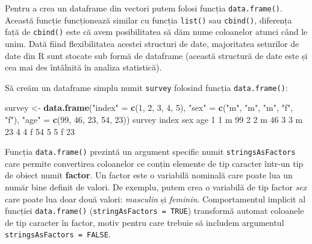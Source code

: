 \documentclass[]{article}
\newenvironment{Shaded}{\begin{snugshade}}{\end{snugshade}}
\newcommand{\DecValTok}[1]{\textcolor[rgb]{0.00,0.00,0.81}{#1}}
\newcommand{\KeywordTok}[1]{\textcolor[rgb]{0.13,0.29,0.53}{\textbf{#1}}}
\newcommand{\NormalTok}[1]{#1}
\newcommand{\StringTok}[1]{\textcolor[rgb]{0.31,0.60,0.02}{#1}}
\begin{document}
Pentru a crea un dataframe din vectori putem folosi funcția
\texttt{data.frame()}. Această funcție funcționează similar cu funcția
\texttt{list()} sau \texttt{cbind()}, diferența față de \texttt{cbind()}
este că avem posibilitatea să dăm nume coloanelor atunci când le unim.
Dată fiind flexibilitatea acestei structuri de date, majoritatea
seturilor de date din R sunt stocate sub formă de dataframe (această
structură de date este și cea mai des întâlnită în analiza statistică).

Să creăm un dataframe simplu numit \texttt{survey} folosind funcția
\texttt{data.frame()}:

\begin{Shaded}
\begin{Highlighting}[]
\NormalTok{survey <-}\StringTok{ }\KeywordTok{data.frame}\NormalTok{(}\StringTok{"index"}\NormalTok{ =}\StringTok{ }\KeywordTok{c}\NormalTok{(}\DecValTok{1}\NormalTok{, }\DecValTok{2}\NormalTok{, }\DecValTok{3}\NormalTok{, }\DecValTok{4}\NormalTok{, }\DecValTok{5}\NormalTok{),}
                     \StringTok{"sex"}\NormalTok{ =}\StringTok{ }\KeywordTok{c}\NormalTok{(}\StringTok{"m"}\NormalTok{, }\StringTok{"m"}\NormalTok{, }\StringTok{"m"}\NormalTok{, }\StringTok{"f"}\NormalTok{, }\StringTok{"f"}\NormalTok{),}
                     \StringTok{"age"}\NormalTok{ =}\StringTok{ }\KeywordTok{c}\NormalTok{(}\DecValTok{99}\NormalTok{, }\DecValTok{46}\NormalTok{, }\DecValTok{23}\NormalTok{, }\DecValTok{54}\NormalTok{, }\DecValTok{23}\NormalTok{))}
\NormalTok{survey}
\NormalTok{  index sex age}
\DecValTok{1}     \DecValTok{1}\NormalTok{   m  }\DecValTok{99}
\DecValTok{2}     \DecValTok{2}\NormalTok{   m  }\DecValTok{46}
\DecValTok{3}     \DecValTok{3}\NormalTok{   m  }\DecValTok{23}
\DecValTok{4}     \DecValTok{4}\NormalTok{   f  }\DecValTok{54}
\DecValTok{5}     \DecValTok{5}\NormalTok{   f  }\DecValTok{23}
\end{Highlighting}
\end{Shaded}

Funcția \texttt{data.frame()} prezintă un argument specific numit
\texttt{stringsAsFactors} care permite convertirea coloanelor ce conțin
elemente de tip caracter într-un tip de obiect numit \textbf{factor}. Un
factor este o variabilă nominală care poate lua un număr bine definit de
valori. De exemplu, putem crea o variabilă de tip factor \emph{sex} care
poate lua doar două valori: \emph{masculin} și \emph{feminin}.
Comportamentul implicit al funcției \texttt{data.frame()}
(\texttt{stringAsFactors\ =\ TRUE}) transformă automat coloanele de tip
caracter în factor, motiv pentru care trebuie să includem argumentul
\texttt{stringsAsFactors\ =\ FALSE}.
\end{document}
